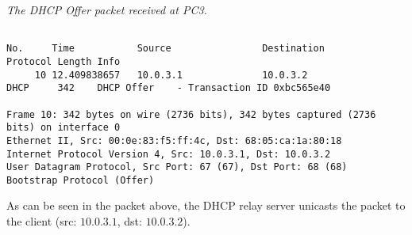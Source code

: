 \textit{The DHCP Offer packet received at PC3.}
\begin{lstlisting}

No.     Time           Source                Destination           Protocol Length Info
     10 12.409838657   10.0.3.1              10.0.3.2              DHCP     342    DHCP Offer    - Transaction ID 0xbc565e40

Frame 10: 342 bytes on wire (2736 bits), 342 bytes captured (2736 bits) on interface 0
Ethernet II, Src: 00:0e:83:f5:ff:4c, Dst: 68:05:ca:1a:80:18
Internet Protocol Version 4, Src: 10.0.3.1, Dst: 10.0.3.2
User Datagram Protocol, Src Port: 67 (67), Dst Port: 68 (68)
Bootstrap Protocol (Offer)

\end{lstlisting}

As can be seen in the packet above, the DHCP relay server unicasts the packet to the client (src: $10.0.3.1$, dst: $10.0.3.2$).
